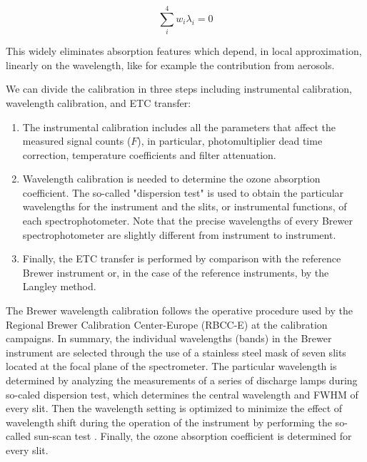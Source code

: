 \documentclass[acp, manuscript]{copernicus}
\begin{document}
\begin{equation}	
	\sum\limits_i^4 {{w_i} {{\lambda}_i} }=0
\end{equation}

This widely eliminates absorption features which depend, in local approximation, linearly on the wavelength, like for example the contribution from aerosols.

We can divide the calibration in three steps including instrumental calibration, wavelength calibration, and ETC transfer:

\begin{enumerate}
	\item The instrumental calibration includes all the parameters that affect the measured signal counts ($F$), in particular, photomultiplier dead time correction, temperature coefficients and filter attenuation.
	\item Wavelength calibration is needed to determine the ozone absorption coefficient. The so-called "dispersion test" is used to obtain the particular wavelengths for the instrument and the slits, or instrumental functions, of each spectrophotometer. Note that the precise wavelengths of every Brewer spectrophotometer are slightly different from instrument to instrument. 
	\item Finally, the ETC transfer is performed by comparison with the reference Brewer instrument or, in the case of the reference instruments, by the Langley method.
\end{enumerate}


The Brewer wavelength calibration follows the operative procedure \citep{Grobner1998, kerr2002new} used by the Regional Brewer Calibration Center-Europe (RBCC-E) at the calibration campaigns. In summary, the individual wavelengths (bands) in the Brewer instrument are selected through the use of a stainless steel mask of seven slits located at the focal plane of the spectrometer. The particular wavelength is determined by analyzing the measurements of  a series of discharge lamps during so-caled dispersion test, which determines the central wavelength and FWHM of every slit. Then the  wavelength setting is optimized to minimize the effect of wavelength shift during the operation of the instrument by performing the so-called sun-scan test \citep{sun_scan_ios}. Finally, the ozone absorption coefficient is determined for every slit.   
\end{document}
